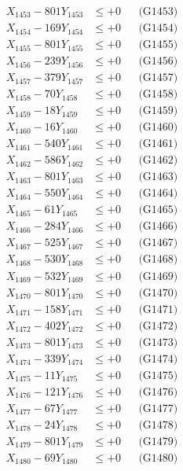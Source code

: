 \documentclass[a4paper,10pt]{article}
\begin{document}
{\begin{align}
X_{1453} - 801Y_{1453} &\leq +0 && \text{(G1453)} \\
X_{1454} - 169Y_{1454} &\leq +0 && \text{(G1454)} \\
X_{1455} - 801Y_{1455} &\leq +0 && \text{(G1455)} \\
X_{1456} - 239Y_{1456} &\leq +0 && \text{(G1456)} \\
X_{1457} - 379Y_{1457} &\leq +0 && \text{(G1457)} \\
X_{1458} - 70Y_{1458} &\leq +0 && \text{(G1458)} \\
X_{1459} - 18Y_{1459} &\leq +0 && \text{(G1459)} \\
X_{1460} - 16Y_{1460} &\leq +0 && \text{(G1460)} \\
\allowbreak
X_{1461} - 540Y_{1461} &\leq +0 && \text{(G1461)} \\
X_{1462} - 586Y_{1462} &\leq +0 && \text{(G1462)} \\
X_{1463} - 801Y_{1463} &\leq +0 && \text{(G1463)} \\
X_{1464} - 550Y_{1464} &\leq +0 && \text{(G1464)} \\
X_{1465} - 61Y_{1465} &\leq +0 && \text{(G1465)} \\
X_{1466} - 284Y_{1466} &\leq +0 && \text{(G1466)} \\
X_{1467} - 525Y_{1467} &\leq +0 && \text{(G1467)} \\
X_{1468} - 530Y_{1468} &\leq +0 && \text{(G1468)} \\
X_{1469} - 532Y_{1469} &\leq +0 && \text{(G1469)} \\
X_{1470} - 801Y_{1470} &\leq +0 && \text{(G1470)} \\
\allowbreak
X_{1471} - 158Y_{1471} &\leq +0 && \text{(G1471)} \\
X_{1472} - 402Y_{1472} &\leq +0 && \text{(G1472)} \\
X_{1473} - 801Y_{1473} &\leq +0 && \text{(G1473)} \\
X_{1474} - 339Y_{1474} &\leq +0 && \text{(G1474)} \\
X_{1475} - 11Y_{1475} &\leq +0 && \text{(G1475)} \\
X_{1476} - 121Y_{1476} &\leq +0 && \text{(G1476)} \\
X_{1477} - 67Y_{1477} &\leq +0 && \text{(G1477)} \\
X_{1478} - 24Y_{1478} &\leq +0 && \text{(G1478)} \\
X_{1479} - 801Y_{1479} &\leq +0 && \text{(G1479)} \\
X_{1480} - 69Y_{1480} &\leq +0 && \text{(G1480)} \\

\end{align}}
\end{document}
